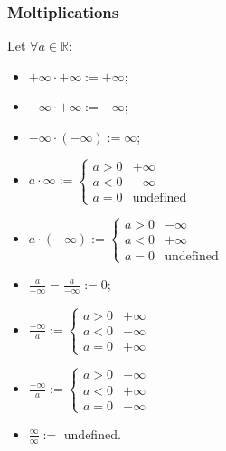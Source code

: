 \documentclass{article}
\begin{document}
\subsubsection{Moltiplications}
Let $\forall a \in \mathbb{R}$:
\begin{itemize}
    \item $+\infty \cdot +\infty := +\infty$;
    \item $-\infty \cdot +\infty := -\infty$;
    \item $-\infty \cdot (-\infty) := \infty$;
    \item $a \cdot \infty := \begin{cases}
        a > 0 &+\infty\\
        a < 0 &-\infty\\
        a = 0 & \text{undefined}
    \end{cases}$
    \item $a \cdot (-\infty):= \begin{cases}
        a > 0 &-\infty\\
        a < 0 &+\infty\\
        a = 0 &\text{undefined}
    \end{cases}$
    \item $\frac{a}{+\infty}=\frac{a}{-\infty} := 0$;
    \item $\frac{+\infty}{a}:= \begin{cases}
        a > 0 &+\infty\\
        a < 0 &-\infty\\
        a = 0 &+\infty
    \end{cases}$
    \item $\frac{-\infty}{a}:= \begin{cases}
        a > 0 &-\infty\\
        a < 0 &+\infty\\
        a = 0 &-\infty
    \end{cases}$
    \item $\frac{\infty}{\infty}:=$ undefined.
\end{itemize}
\end{document}
